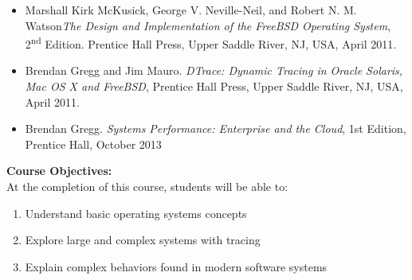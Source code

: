 \documentclass[11pt]{article}
\begin{document}
\begin{itemize}
\item Marshall Kirk McKusick, George V. Neville-Neil, and Robert
  N. M. Watson\emph{The Design and Implementation of the FreeBSD
    Operating System}, 2\textsuperscript{nd} Edition. Prentice Hall
  Press, Upper Saddle River, NJ, USA, April 2011.
\item Brendan Gregg and Jim Mauro. \emph{DTrace: Dynamic Tracing in
    Oracle Solaris, Mac OS X and FreeBSD}, Prentice Hall Press, Upper
  Saddle River, NJ, USA, April 2011.
\item Brendan Gregg. \emph{Systems Performance: Enterprise and the
    Cloud}, 1st Edition, Prentice Hall, October 2013
\end{itemize}

\textbf {\large Course Objectives:} \\
At the completion of this course, students will be able to:
\begin{enumerate} \itemsep-0.4em
  \item Understand basic operating systems concepts
  \item Explore large and complex systems with tracing
  \item Explain complex behaviors found in modern software systems
\end{enumerate}


\end{document}
